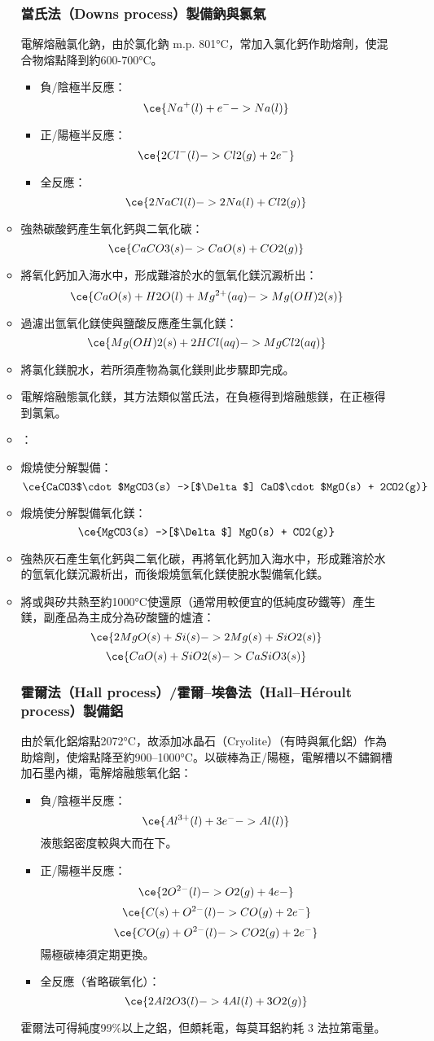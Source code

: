 \documentclass[a4paper,12pt]{report}
\begin{document}
\begin{itemize}
\begin{itemize}
\subsubsection{當氏法（Downs process）製備鈉與氯氣}
電解熔融氯化鈉，由於氯化鈉 m.p. 801°C，常加入氯化鈣作助熔劑，使混合物熔點降到約600-700°C。
\begin{itemize}
\item 負/陰極半反應：
\[\ce{Na^+(l) + e^- -> Na(l)}\]
\item 正/陽極半反應：
\[\ce{2Cl^-(l) -> Cl2(g) + 2e^-}\]
\item 全反應：
\[\ce{2NaCl(l) -> 2Na(l) + Cl2(g)}\]
\end{itemize}
\ben
\item 強熱碳酸鈣產生氧化鈣與二氧化碳：
\[\ce{CaCO3(s) -> CaO(s) + CO2(g)}\]
\item 將氧化鈣加入海水中，形成難溶於水的氫氧化鎂沉澱析出：
\[\ce{CaO(s) + H2O(l) + Mg^{2+}(aq) -> Mg(OH)2(s)}\]
\item 過濾出氫氧化鎂使與鹽酸反應產生氯化鎂：
\[\ce{Mg(OH)2(s) + 2HCl(aq) -> MgCl2(aq)}\]
\item 將氯化鎂脫水，若所須產物為氯化鎂則此步驟即完成。
\item 電解熔融態氯化鎂，其方法類似當氏法，在負極得到熔融態鎂，在正極得到氯氣。
\een
{}
\bit
\item {}：
\bit
\item 煅燒使分解製備：
\[\ce{CaCO3$\cdot$MgCO3(s) ->[$\Delta$] CaO$\cdot$MgO(s) + 2CO2(g)}\]
\item 煅燒使分解製備氧化鎂：
\[\ce{MgCO3(s) ->[$\Delta$] MgO(s) + CO2(g)}\]
\item 強熱灰石產生氧化鈣與二氧化碳，再將氧化鈣加入海水中，形成難溶於水的氫氧化鎂沉澱析出，而後煅燒氫氧化鎂使脫水製備氧化鎂。
\eit
\item 將或與矽共熱至約1000°C使還原（通常用較便宜的低純度矽鐵等）產生鎂，副產品為主成分為矽酸鹽的爐渣：
\[\ce{2MgO(s) + Si(s) -> 2Mg(s) + SiO2(s)}\]
\[\ce{CaO(s) + SiO2(s) -> CaSiO3(s)}\]
\eit
\subsubsection{霍爾法（Hall process）/霍爾–埃魯法（Hall–Héroult process）製備鋁}
由於氧化鋁熔點2072°C，故添加冰晶石（Cryolite）（有時與氟化鋁）作為助熔劑，使熔點降至約900–1000°C。以碳棒為正/陽極，電解槽以不鏽鋼槽加石墨內襯，電解熔融態氧化鋁：
\begin{itemize}
\item 負/陰極半反應：
\[\ce{Al^{3+}(l) + 3e^- -> Al(l)}\]
液態鋁密度較與大而在下。
\item 正/陽極半反應：
\[\ce{2O^{2-}(l) -> O2(g) + 4e-}\]
\[\ce{C(s) + O^{2-}(l) -> CO(g) + 2e^-}\]
\[\ce{CO(g) + O^{2-}(l) -> CO2(g) + 2e^-}\]
陽極碳棒須定期更換。
\item 全反應（省略碳氧化）：
\[\ce{2Al2O3(l) -> 4Al(l) + 3O2(g)}\]
\end{itemize}
霍爾法可得純度99\%以上之鋁，但頗耗電，每莫耳鋁約耗 3 法拉第電量。

\end{itemize}
\end{itemize}
\end{document}
